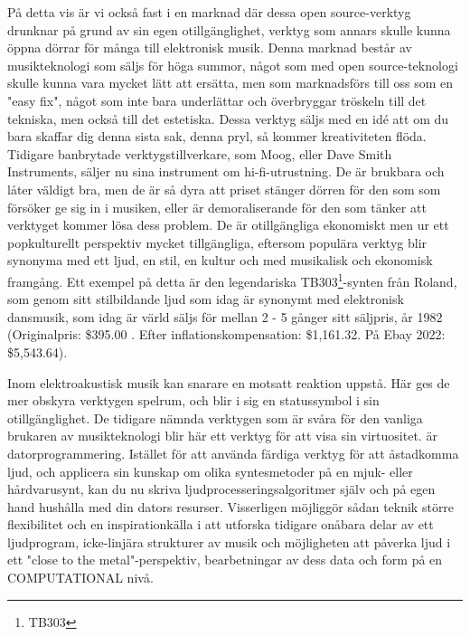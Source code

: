 \documentclass{article}
\begin{document}
  På detta vis är vi också fast i en marknad där dessa open source-verktyg drunknar på grund av sin egen
  otillgänglighet, verktyg som annars skulle kunna öppna dörrar för många till elektronisk musik. Denna
  marknad består av musikteknologi som säljs för höga summor, något som med open source-teknologi skulle kunna
  vara mycket lätt att ersätta, men som marknadsförs till oss som en "easy fix", något som inte bara
  underlättar och överbryggar tröskeln till det tekniska, men också till det estetiska. Dessa verktyg
  säljs med en idé att om du bara skaffar dig denna sista sak, denna pryl, så kommer kreativiteten flöda.
  Tidigare banbrytade verktygstillverkare, som Moog, eller Dave Smith Instruments, säljer nu sina instrument
  om hi-fi-utrustning. De är brukbara och låter väldigt bra, men de är så dyra att priset stänger dörren för
  den som som försöker ge sig in i musiken, eller är demoraliserande för den som tänker att verktyget kommer
  lösa dess problem. De är otillgängliga ekonomiskt men ur ett popkulturellt perspektiv mycket tillgängliga,
  eftersom populära verktyg blir synonyma med ett ljud, en stil, en kultur och med musikalisk och ekonomisk
  framgång. Ett exempel på detta är den legendariska TB303\footnote{TB303}-synten från Roland, som genom sitt
  stilbildande ljud som idag är synonymt med elektronisk dansmusik, som idag är värld säljs för mellan 2 - 5
  gånger sitt säljpris, år 1982 (Originalpris: \$395.00 . Efter inflationskompensation: \$1,161.32. På Ebay
  2022: \$5,543.64).



  Inom elektroakustisk musik kan snarare en motsatt reaktion uppstå. Här ges de mer obskyra verktygen spelrum,
  och blir i sig en statussymbol i sin otillgänglighet. De tidigare nämnda verktygen som är svåra för den
  vanliga brukaren av musikteknologi blir här ett verktyg för att visa sin virtuositet. 
  är datorprogrammering. 
  Istället för att använda färdiga verktyg för att åstadkomma ljud, och applicera sin kunskap om olika
  syntesmetoder på en mjuk- eller hårdvarusynt, kan du nu skriva ljudprocesseringsalgoritmer själv och på egen
  hand hushålla med din dators resurser. Visserligen möjliggör sådan teknik större flexibilitet och en
  inspirationkälla i att utforska tidigare onåbara delar av ett ljudprogram, icke-linjära strukturer av musik
  och möjligheten att påverka ljud i ett "close to the metal"-perspektiv, bearbetningar av dess data och form
  på en COMPUTATIONAL nivå.
\end{document}
